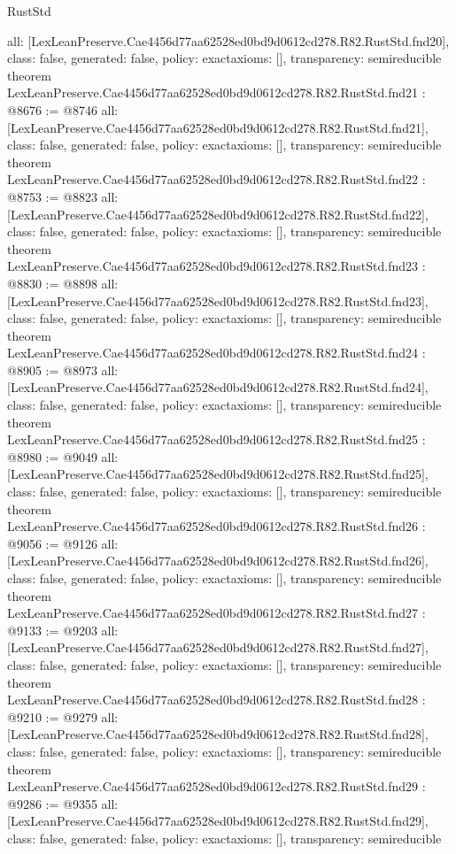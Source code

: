 \begin{lexlean}{RustStd}
\begin{coremodule}
{  all: [LexLeanPreserve.Cae4456d77aa62528ed0bd9d0612cd278.R82.RustStd.fnd20],
  class: false,
  generated: false,
  policy: exact{axioms: []},
  transparency: semireducible
}
theorem LexLeanPreserve.Cae4456d77aa62528ed0bd9d0612cd278.R82.RustStd.fnd21 : @8676 := @8746 {
  all: [LexLeanPreserve.Cae4456d77aa62528ed0bd9d0612cd278.R82.RustStd.fnd21],
  class: false,
  generated: false,
  policy: exact{axioms: []},
  transparency: semireducible
}
theorem LexLeanPreserve.Cae4456d77aa62528ed0bd9d0612cd278.R82.RustStd.fnd22 : @8753 := @8823 {
  all: [LexLeanPreserve.Cae4456d77aa62528ed0bd9d0612cd278.R82.RustStd.fnd22],
  class: false,
  generated: false,
  policy: exact{axioms: []},
  transparency: semireducible
}
theorem LexLeanPreserve.Cae4456d77aa62528ed0bd9d0612cd278.R82.RustStd.fnd23 : @8830 := @8898 {
  all: [LexLeanPreserve.Cae4456d77aa62528ed0bd9d0612cd278.R82.RustStd.fnd23],
  class: false,
  generated: false,
  policy: exact{axioms: []},
  transparency: semireducible
}
theorem LexLeanPreserve.Cae4456d77aa62528ed0bd9d0612cd278.R82.RustStd.fnd24 : @8905 := @8973 {
  all: [LexLeanPreserve.Cae4456d77aa62528ed0bd9d0612cd278.R82.RustStd.fnd24],
  class: false,
  generated: false,
  policy: exact{axioms: []},
  transparency: semireducible
}
theorem LexLeanPreserve.Cae4456d77aa62528ed0bd9d0612cd278.R82.RustStd.fnd25 : @8980 := @9049 {
  all: [LexLeanPreserve.Cae4456d77aa62528ed0bd9d0612cd278.R82.RustStd.fnd25],
  class: false,
  generated: false,
  policy: exact{axioms: []},
  transparency: semireducible
}
theorem LexLeanPreserve.Cae4456d77aa62528ed0bd9d0612cd278.R82.RustStd.fnd26 : @9056 := @9126 {
  all: [LexLeanPreserve.Cae4456d77aa62528ed0bd9d0612cd278.R82.RustStd.fnd26],
  class: false,
  generated: false,
  policy: exact{axioms: []},
  transparency: semireducible
}
theorem LexLeanPreserve.Cae4456d77aa62528ed0bd9d0612cd278.R82.RustStd.fnd27 : @9133 := @9203 {
  all: [LexLeanPreserve.Cae4456d77aa62528ed0bd9d0612cd278.R82.RustStd.fnd27],
  class: false,
  generated: false,
  policy: exact{axioms: []},
  transparency: semireducible
}
theorem LexLeanPreserve.Cae4456d77aa62528ed0bd9d0612cd278.R82.RustStd.fnd28 : @9210 := @9279 {
  all: [LexLeanPreserve.Cae4456d77aa62528ed0bd9d0612cd278.R82.RustStd.fnd28],
  class: false,
  generated: false,
  policy: exact{axioms: []},
  transparency: semireducible
}
theorem LexLeanPreserve.Cae4456d77aa62528ed0bd9d0612cd278.R82.RustStd.fnd29 : @9286 := @9355 {
  all: [LexLeanPreserve.Cae4456d77aa62528ed0bd9d0612cd278.R82.RustStd.fnd29],
  class: false,
  generated: false,
  policy: exact{axioms: []},
  transparency: semireducible
}
\end{coremodule}
\end{lexlean}
